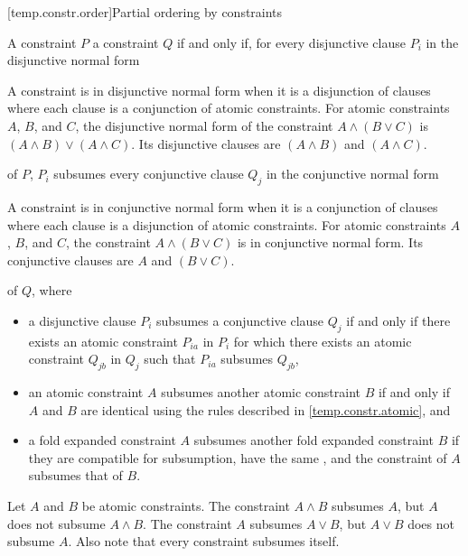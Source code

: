 [temp.constr.order]{Partial ordering by constraints}

\pnum
{}
A constraint $P$  a constraint $Q$
if and only if,
for every disjunctive clause $P_i$
in the disjunctive normal form
\begin{footnote}
A constraint is in disjunctive normal form when it is a disjunction of
clauses where each clause is a conjunction of atomic constraints.
For atomic constraints $A$, $B$, and $C$, the disjunctive normal form
of the constraint
$A \land (B \lor C)$
is
$(A \land B) \lor (A \land C)$.
%
Its disjunctive clauses are $(A \land B)$ and $(A \land C)$.
\end{footnote}
of $P$, $P_i$ subsumes every conjunctive clause $Q_j$
in the conjunctive normal form
\begin{footnote}
A constraint is in conjunctive normal form when it is a conjunction
of clauses where each clause is a disjunction of atomic constraints.
For atomic constraints $A$, $B$, and $C$, the constraint
$A \land (B \lor C)$ is in conjunctive normal form.
%
Its conjunctive clauses are $A$ and $(B \lor C)$.
\end{footnote}
of $Q$, where
\begin{itemize}
\item
a disjunctive clause $P_i$ subsumes a conjunctive clause $Q_j$ if and only
if there exists an atomic constraint $P_{ia}$ in $P_i$ for which there exists
an atomic constraint $Q_{jb}$ in $Q_j$ such that $P_{ia}$ subsumes $Q_{jb}$,

\item an atomic constraint $A$ subsumes another atomic constraint
$B$ if and only if $A$ and $B$ are identical using the
rules described in \ref{temp.constr.atomic}, and

\item a fold expanded constraint $A$ subsumes
another fold expanded constraint $B$
if they are compatible for subsumption,
have the same , and
the constraint of $A$ subsumes that of $B$.
\end{itemize}
%
\begin{example}
Let $A$ and $B$ be atomic constraints.
%
The constraint $A \land B$ subsumes $A$, but $A$ does not subsume $A \land B$.
%
The constraint $A$ subsumes $A \lor B$, but $A \lor B$ does not subsume $A$.
%
Also note that every constraint subsumes itself.
\end{example}


